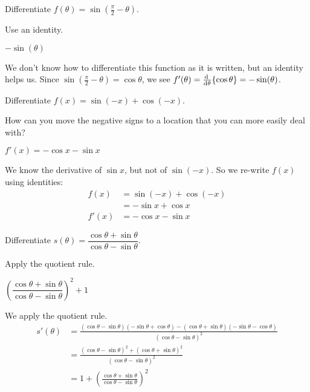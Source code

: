 \begin{question}
Differentiate $f(\theta)=\sin\left(\frac{\pi}{2}-\theta \right)$.
\end{question}
\begin{hint}
Use an identity.
\end{hint}
\begin{answer}
$-\sin(\theta)$
\end{answer}
\begin{solution}
We don't know how to differentiate this function as it is written, but an identity helps us.
Since $\sin\left(\frac{\pi}{2}-\theta \right)=\cos \theta$, we see
$f'(\theta)=\diff{}{\theta}\{\cos \theta\}=-\sin(\theta)$.
\end{solution}

\begin{question}
Differentiate $f(x)=\sin(-x)+\cos(-x)$.
\end{question}
\begin{hint}
How can you move the negative signs to a location that you can more easily deal with?
\end{hint}
\begin{answer}
$f'(x)=-\cos x - \sin x$
\end{answer}
\begin{solution}
We know the derivative of $\sin x$, but not of $\sin(-x)$. So we re-write $f(x)$ using identities:
\begin{align*}
f(x)&=\sin(-x)+\cos(-x)\\
&=-\sin x + \cos x\\
f'(x)&=-\cos x - \sin x
\end{align*}
\end{solution}


\begin{question}
Differentiate $s(\theta)=\dfrac{\cos \theta + \sin \theta}{\cos \theta - \sin\theta}$.
\end{question}
\begin{hint} Apply the quotient rule.
\end{hint}
\begin{answer}
$\left(\dfrac{\cos\theta+\sin\theta}{\cos\theta-\sin\theta}\right)^2+1$
\end{answer}
\begin{solution}
We apply the quotient rule.
\begin{align*}
s'(\theta)&=\frac{(\cos \theta-\sin\theta)(-\sin\theta+\cos\theta)-(\cos\theta+\sin\theta)(-\sin\theta-\cos\theta)}{(\cos\theta-\sin\theta)^2}\\
&=\frac{(\cos \theta-\sin\theta)^2+(\cos\theta+\sin\theta)^2}{(\cos\theta-\sin\theta)^2}\\
&=1+\left(\frac{\cos\theta+\sin\theta}{\cos\theta-\sin\theta}\right)^2
\end{align*}
\end{solution}


